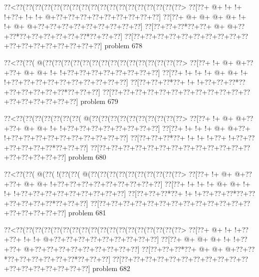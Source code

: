 \vbox{\vbox{\goo
\0??<\0??(\0??(\0??(\0??(\0??(\0??(\0??(\0??(\0??(\0??(\0??(\0??(\0??(\0??(\0??(\0??(\0??(\0??>
\0??[\0??+\- @+\- !+\- !+\- !+\0??+\- !+\- !+\- @+\0??+\0??+\0??+\0??+\0??+\0??+\0??+\0??+\0??]
\0??[\0??+\- @+\- @+\- @+\- @+\- !+\- !+\- @+\- @+\0??+\0??+\0??+\0??+\0??+\0??+\0??+\0??+\0??]
\0??[\0??+\0??+\0??*\0??+\0??+\- @+\- @+\0??+\0??*\0??+\0??+\0??+\0??+\0??+\0??*\0??+\0??+\0??]
\0??[\0??+\0??+\0??+\0??+\0??+\0??+\0??+\0??+\0??+\0??+\0??+\0??+\0??+\0??+\0??+\0??+\0??+\0??]
}
\hfil problem 678\hfil\break
}



\vbox{\vbox{\goo
\0??<\0??(\0??(\- @(\0??(\0??(\0??(\0??(\0??(\0??(\0??(\0??(\0??(\0??(\0??(\0??(\0??(\0??(\0??>
\0??[\0??+\- !+\- @+\- @+\0??+\0??+\- @+\- @+\- !+\- !+\0??+\0??+\0??+\0??+\0??+\0??+\0??+\0??]
\0??[\0??+\- !+\- !+\- !+\- @+\- @+\- !+\- !+\0??+\0??+\0??+\0??+\0??+\0??+\0??+\0??+\0??+\0??]
\0??[\0??+\0??+\0??*\0??+\- !+\- !+\0??+\0??+\0??*\0??+\0??+\0??+\0??+\0??+\0??*\0??+\0??+\0??]
\0??[\0??+\0??+\0??+\0??+\0??+\0??+\0??+\0??+\0??+\0??+\0??+\0??+\0??+\0??+\0??+\0??+\0??+\0??]
}
\hfil problem 679\hfil\break
}



\vbox{\vbox{\goo
\0??<\0??(\0??(\0??(\0??(\0??(\0??(\0??(\- @(\0??(\0??(\0??(\0??(\0??(\0??(\0??(\0??(\0??(\0??>
\0??[\0??+\- !+\- @+\- @+\0??+\0??+\- @+\- @+\- !+\- !+\0??+\0??+\0??+\0??+\0??+\0??+\0??+\0??]
\0??[\0??+\- !+\- !+\- !+\- @+\- @+\0??+\- !+\0??+\0??+\0??+\0??+\0??+\0??+\0??+\0??+\0??+\0??]
\0??[\0??+\0??+\0??*\0??+\- !+\- !+\- !+\0??+\- !+\0??+\0??+\0??+\0??+\0??+\0??*\0??+\0??+\0??]
\0??[\0??+\0??+\0??+\0??+\0??+\0??+\0??+\0??+\0??+\0??+\0??+\0??+\0??+\0??+\0??+\0??+\0??+\0??]
}
\hfil problem 680\hfil\break
}



\vbox{\vbox{\goo
\0??<\0??(\0??(\- @(\0??(\- !(\0??(\0??(\- @(\0??(\0??(\0??(\0??(\0??(\0??(\0??(\0??(\0??(\0??>
\0??[\0??+\- !+\- @+\- @+\0??+\0??+\- @+\- @+\- !+\0??+\0??+\0??+\0??+\0??+\0??+\0??+\0??+\0??]
\0??[\0??+\- !+\- !+\- !+\- @+\- @+\- !+\- !+\- !+\0??+\0??+\0??+\0??+\0??+\0??+\0??+\0??+\0??]
\0??[\0??+\0??+\0??*\0??+\- !+\- !+\0??+\0??+\0??*\0??+\0??+\0??+\0??+\0??+\0??*\0??+\0??+\0??]
\0??[\0??+\0??+\0??+\0??+\0??+\0??+\0??+\0??+\0??+\0??+\0??+\0??+\0??+\0??+\0??+\0??+\0??+\0??]
}
\hfil problem 681\hfil\break
}



\vbox{\vbox{\goo
\0??<\0??(\0??(\0??(\0??(\0??(\0??(\0??(\0??(\0??(\0??(\0??(\0??(\0??(\0??(\0??(\0??(\0??(\0??>
\0??[\0??+\- @+\- !+\- !+\0??+\0??+\- !+\- !+\- @+\0??+\0??+\0??+\0??+\0??+\0??+\0??+\0??+\0??]
\0??[\0??+\- @+\- @+\- @+\- !+\- !+\0??+\0??+\- @+\0??+\0??+\0??+\0??+\0??+\0??+\0??+\0??+\0??]
\0??[\0??+\0??+\0??*\0??+\- @+\- @+\- @+\0??+\0??*\0??+\0??+\0??+\0??+\0??+\0??*\0??+\0??+\0??]
\0??[\0??+\0??+\0??+\0??+\0??+\0??+\0??+\0??+\0??+\0??+\0??+\0??+\0??+\0??+\0??+\0??+\0??+\0??]
}
\hfil problem 682\hfil\break
}



